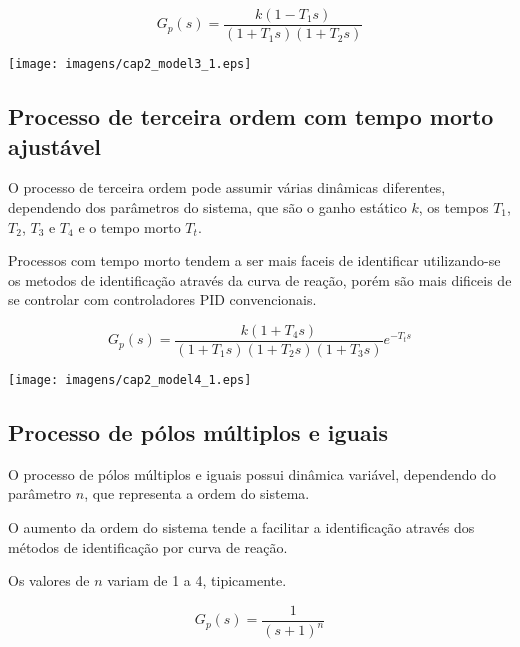     \begin{equation}
        G_p(s) = \frac{k(1-T_1 s)}{(1+T_1 s)(1+T_2 s)}
    \end{equation}

    \begin{center}
        \texttt{[image: imagens/cap2\_model3\_1.eps]}
	\label{cap2_3}
    \end{center}

\subsection{Processo de terceira ordem com tempo morto ajustável}
    
    O processo de terceira ordem pode assumir várias dinâmicas diferentes, dependendo
    dos parâmetros do sistema, que são o ganho estático $k$, os tempos $T_1$, $T_2$,
    $T_3$ e $T_4$ e o tempo morto $T_t$.
    
    Processos com tempo morto tendem a ser mais faceis de identificar utilizando-se
    os metodos de identificação através da curva de reação, porém são mais dificeis
    de se controlar com controladores \acs{PID} convencionais.
    
    \begin{equation}
        G_p(s) = \frac{k(1+T_4 s)}{(1+T_1 s)(1+T_2 s)(1+T_3 s)} e^{-T_t s}
    \end{equation}
    
    \begin{center}
        \texttt{[image: imagens/cap2\_model4\_1.eps]}
    \end{center}

\subsection{Processo de pólos múltiplos e iguais}

    O processo de pólos múltiplos e iguais possui dinâmica variável, dependendo
    do parâmetro $n$, que representa a ordem do sistema.
    
    O aumento da ordem do sistema tende a facilitar a identificação através dos
    métodos de identificação por curva de reação.
    
    Os valores de $n$ variam de 1 a 4, tipicamente.
    
    \begin{equation}
        G_p(s) = \frac{1}{(s+1)^n}
    \end{equation}

